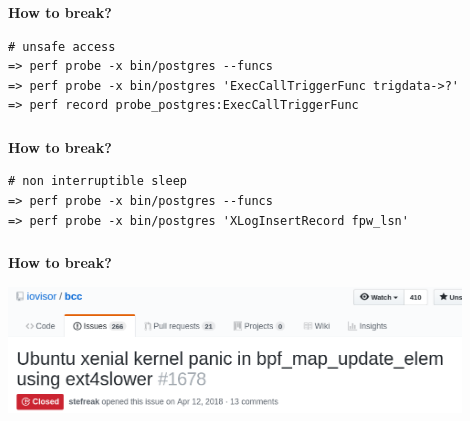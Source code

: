 \documentclass[usenames,dvipsnames, 18pt, compress, aspectratio=169]{beamer}
\begin{document}
\begin{frame}[fragile]{}
    \frametitle{}
    \begin{center}
        \textbf{How to break?}

        \begin{verbatim}
# unsafe access
=> perf probe -x bin/postgres --funcs
=> perf probe -x bin/postgres 'ExecCallTriggerFunc trigdata->?'
=> perf record probe_postgres:ExecCallTriggerFunc
        \end{verbatim}

    \end{center}
\end{frame}

\begin{frame}[fragile]{}
    \frametitle{}
    \begin{center}
        \textbf{How to break?}

        \begin{verbatim}
# non interruptible sleep
=> perf probe -x bin/postgres --funcs
=> perf probe -x bin/postgres 'XLogInsertRecord fpw_lsn'
        \end{verbatim}

    \end{center}
\end{frame}

\begin{frame}[fragile]{}
    \frametitle{}
    \begin{center}
        \textbf{How to break?}

        \includegraphics[width=0.9\textwidth,center]{bcc_kernel_panic.png}

    \end{center}
\end{frame}
\end{document}
